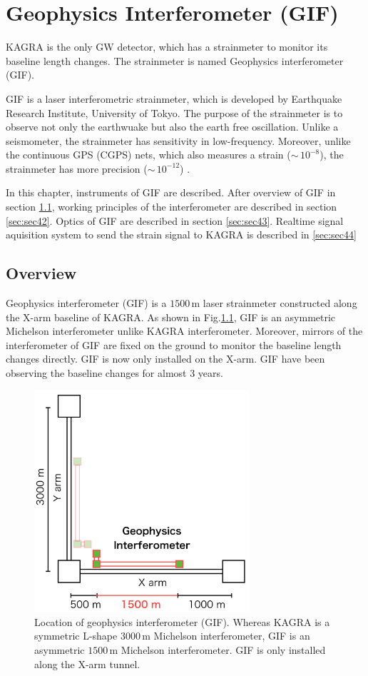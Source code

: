 \chapter{Geophysics Interferometer (GIF)}
KAGRA is the only GW detector, which has a strainmeter to monitor its baseline length changes. The strainmeter is named Geophysics interferometer (GIF).

GIF is a laser interferometric strainmeter, which is developed by Earthquake Research Institute, University of Tokyo. The purpose of the strainmeter is to observe not only the earthwuake but also the earth free oscillation. Unlike a seismometer, the strainmeter has sensitivity in low-frequency. Moreover, unlike the continuous GPS (CGPS) nets, which also measures a strain ($\sim\,10^{-8}$), the strainmeter has more precision ($\sim\,10^{-12}$) \cite{araya2007broadband}.

In this chapter, instruments of GIF are described. After overview of GIF in section \cref{sec:sec41}, working principles of the interferometer are described in section \cref{sec:sec42}. Optics of GIF are described in section \cref{sec:sec43}. Realtime signal aquisition system to send the strain signal to KAGRA is described in \cref{sec:sec44}

\section{Overview} \label{sec:sec41}
Geophysics interferometer (GIF) is a $1500\,\mathrm{m}$ laser strainmeter constructed along the X-arm baseline of KAGRA. As shown in Fig.\ref{img:img402}, GIF is an asymmetric Michelson interferometer unlike KAGRA interferometer. Moreover, mirrors of the interferometer of GIF are fixed on the ground to monitor the baseline length changes directly. GIF is now only installed on the X-arm. GIF have been observing the baseline changes for almost 3 years.
\begin{figure}[h]
  \centering
  \includegraphics[width=8cm]{./img_chap4/img402.png}
  \caption{Location of geophysics interferometer (GIF). Whereas KAGRA is a symmetric L-shape $3000\,\mathrm{m}$ Michelson interferometer, GIF is an asymmetric $1500\,\mathrm{m}$ Michelson interferometer. GIF is only installed along the X-arm tunnel.} \label{img:img402}
\end{figure}

